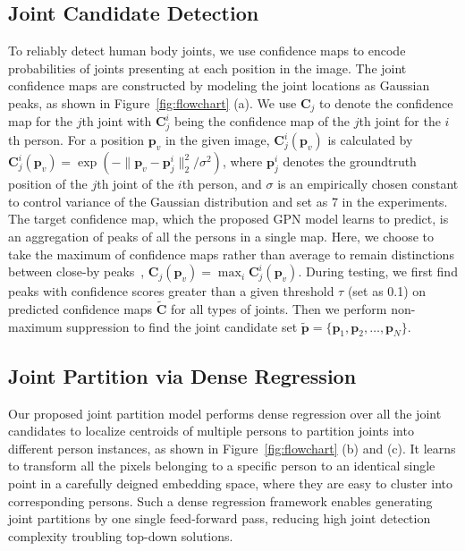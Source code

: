 \documentclass[10pt,twocolumn,letterpaper]{article}
\begin{document}
\subsection{Joint Candidate Detection}
\label{subsec:joint_detection}

To reliably detect human body joints, we use  confidence maps to encode probabilities  of joints presenting at each position in the image. The joint confidence maps  are constructed by modeling
the joint locations as Gaussian peaks, as shown in Figure~\ref{fig:flowchart} (a). We use $\mathbf{C}_{j}$ to denote the confidence map for the $j$th joint with  $\mathbf{C}_{j}^i$ being the
confidence map of the $j$th joint for the $i$th person. For a position $\mathbf{p}_v$ in the given image, $\mathbf{C}_{j}^i(\mathbf{p}_v)$ is calculated by
$\mathbf{C}_{j}^i(\mathbf{p}_v){=}\exp\left(-{\|\mathbf{p}_v{-}\mathbf{p}_j^i\|_2^2}/{\sigma^2}\right)$,
where $\mathbf{p}_j^i$ denotes the groundtruth position of the $j$th joint of the $i$th person, and $\sigma$ is an empirically chosen constant to control  variance of the Gaussian distribution and set as 7 in the experiments.
The target confidence map, which the proposed GPN model learns to predict, is an aggregation of peaks of all the persons in a single map. Here, we choose to take the maximum of confidence maps
rather than average to remain distinctions between close-by peaks~\cite{cao2017realtime}, \ie $\mathbf{C}_{j}(\mathbf{p}_v){=}\max_i\mathbf{C}_{j}^i(\mathbf{p}_v)$.
During testing, we first find peaks with confidence scores greater than a given threshold $\tau$ (set as 0.1) on predicted confidence maps $\tilde{\mathbf{C}}$ for all types of joints.
Then we perform non-maximum suppression to find the joint candidate set $\tilde{\mathbf{p}}{=}\{\mathbf{p}_1,\mathbf{p}_2,\ldots, \mathbf{p}_N\}$.



\subsection{Joint Partition via Dense Regression}
\label{subsec:partition}

Our proposed joint partition model performs dense regression over all the joint candidates to localize centroids of multiple persons to partition joints into different person instances,
as shown in Figure~\ref{fig:flowchart} (b) and (c). It learns to transform all the pixels belonging to a specific person to an identical single point in a carefully deigned embedding space, where they are easy to cluster into corresponding persons. Such a dense regression framework enables generating joint partitions by one single feed-forward pass, reducing high joint detection complexity troubling top-down solutions.
\end{document}
